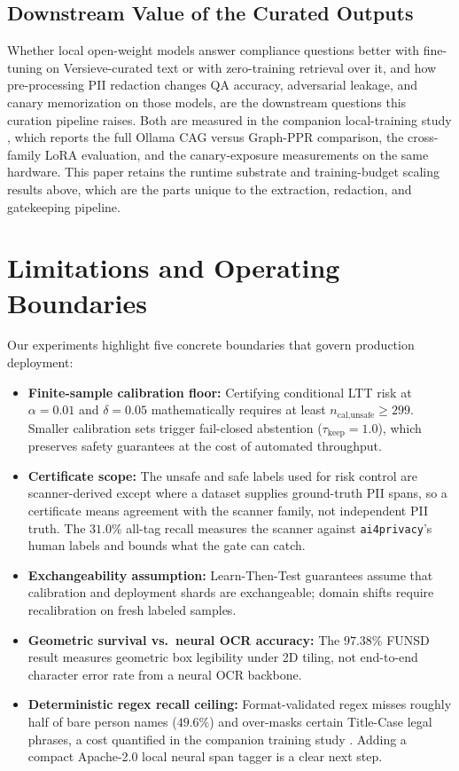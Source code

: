 \documentclass{article}
\begin{document}
\subsection{Downstream Value of the Curated Outputs}
\label{sec:trackc}

Whether local open-weight models answer compliance questions better with fine-tuning on Versieve-curated text or with zero-training retrieval over it, and how pre-processing PII redaction changes QA accuracy, adversarial leakage, and canary memorization on those models, are the downstream questions this curation pipeline raises. Both are measured in the companion local-training study \citep{ardiyansyah2026localtraining}, which reports the full Ollama CAG versus Graph-PPR comparison, the cross-family LoRA evaluation, and the canary-exposure measurements on the same hardware. This paper retains the runtime substrate and training-budget scaling results above, which are the parts unique to the extraction, redaction, and gatekeeping pipeline.

\section{Limitations and Operating Boundaries}
\label{sec:limitations}

Our experiments highlight five concrete boundaries that govern production deployment:
\begin{itemize}
    \item \textbf{Finite-sample calibration floor:} Certifying conditional LTT risk at $\alpha=0.01$ and $\delta=0.05$ mathematically requires at least $n_{\text{cal,unsafe}} \ge 299$. Smaller calibration sets trigger fail-closed abstention ($\tau_{\text{keep}}=1.0$), which preserves safety guarantees at the cost of automated throughput.
    \item \textbf{Certificate scope:} The unsafe and safe labels used for risk control are scanner-derived except where a dataset supplies ground-truth PII spans, so a certificate means agreement with the scanner family, not independent PII truth. The $31.0\%$ all-tag recall measures the scanner against \texttt{ai4privacy}'s human labels and bounds what the gate can catch.
    \item \textbf{Exchangeability assumption:} Learn-Then-Test guarantees assume that calibration and deployment shards are exchangeable; domain shifts require recalibration on fresh labeled samples.
    \item \textbf{Geometric survival vs.\ neural OCR accuracy:} The $97.38\%$ FUNSD result measures geometric box legibility under 2D tiling, not end-to-end character error rate from a neural OCR backbone.
    \item \textbf{Deterministic regex recall ceiling:} Format-validated regex misses roughly half of bare person names ($49.6\%$) and over-masks certain Title-Case legal phrases, a cost quantified in the companion training study \citep{ardiyansyah2026localtraining}. Adding a compact Apache-2.0 local neural span tagger is a clear next step.
\end{itemize}
\end{document}
